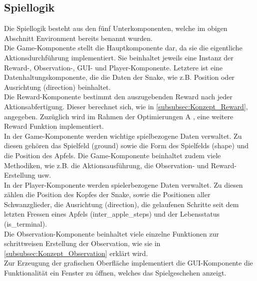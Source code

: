 \subsection{Spiellogik} \label{subsec:Konzept_Spiellogik}
Die Spiellogik besteht aus den fünf Unterkomponenten, welche im obigen Abschnitt Environment bereits benannt wurden.\\
Die Game-Komponente stellt die Hauptkomponente dar, da sie die eigentliche Aktionsdurchführung implementiert. Sie beinhaltet jeweils eine Instanz der Reward-, Observation-, GUI- und Player-Komponente. Letztere ist eine Datenhaltungskomponente, die die Daten der Snake, wie z.B. Position oder Ausrichtung (direction) beinhaltet.\\
Die Reward-Komponente bestimmt den auszugebenden Reward nach jeder Aktionsabfertigung. Dieser berechnet sich, wie in \autoref{subsubsec:Konzept_Reward}, angegeben. Zuzüglich wird im Rahmen der Optimierungen A , eine weitere Reward Funktion implementiert.\\
In der Game-Komponente werden wichtige spielbezogene Daten verwaltet. Zu diesen gehören das Spielfeld (ground) sowie die Form des Spielfelds (shape) und die Position des Apfels. Die Game-Komponente beinhaltet zudem viele Methodiken, wie z.B. die Aktionsausführung, die Observation- und Reward-Erstellung usw.\\
In der Player-Komponente werden spielerbezogene Daten verwaltet. Zu diesen zählen die Position des Kopfes der Snake, sowie die Positionen aller Schwanzglieder, die Ausrichtung (direction), die gelaufenen Schritte seit dem letzten Fressen eines Apfels (inter\_apple\_steps) und der Lebensstatus (is\_terminal).\\
Die Observation-Komponente beinhaltet viele einzelne Funktionen zur schrittweisen Erstellung der Observation, wie sie in \autoref{subsubsec:Konzept_Observation} erklärt wird.\\
Zur Erzeugung der grafischen Oberfläche implementiert die GUI-Komponente die Funktionalität ein Fenster zu öffnen, welches das Spielgeschehen anzeigt.

